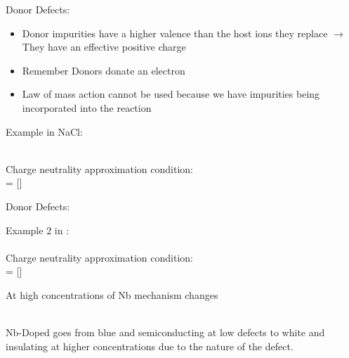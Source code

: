 \documentclass{libs/XJTLU_format}
\begin{document}
\begin{frame}{Donor Defects:}
\begin{itemize}
    \item Donor impurities have a higher valence than the host ions they replace $\rightarrow$ They have an effective positive charge \pause
    \item Remember Donors donate an electron \pause
    \item Law of mass action cannot be used because we have impurities being incorporated into the reaction
\end{itemize}

\pause
Example  in NaCl:\\[0.1cm]

\centering
{}\\[6 pt] \pause

\justifying
Charge neutrality approximation condition: \\[0.1cm]

\centering
[\ce{Ca_{Na}^{$\bullet$}}] = []

\end{frame}

\begin{frame}{Donor Defects:}

Example 2  in :\\[0.1cm]

\pause
\centering
{}\\[0.1cm]

\pause
\justifying
Charge neutrality approximation condition: \\[0.1cm]

\centering
[\ce{Nb_{Ti}^{$\bullet$}}] = []

\pause
\justifying
At high concentrations of Nb mechanism changes

\centering
{}\\[6 pt]

\pause
\justifying
Nb-Doped  goes from blue and semiconducting at low defects to white and insulating at higher concentrations due to the nature of the defect.

\end{frame}
\end{document}
